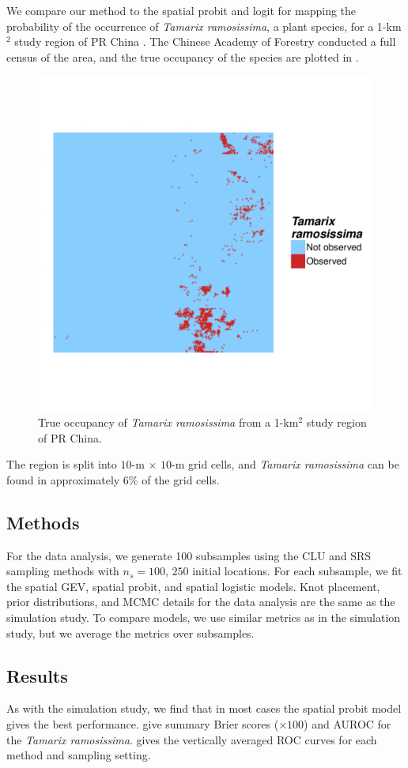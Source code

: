 We compare our method to the spatial probit and logit for mapping the probability of the occurrence of \emph{Tamarix ramosissima}, a plant species, for a 1-km$^2$ study region of PR China \citep{Smith2012}.
The Chinese Academy of Forestry conducted a full census of the area, and the true occupancy of the species are plotted in .
\begin{figure}
  \centering
  \includegraphics[width=0.5\linewidth, trim=0 10em 0 10em]{plots/tamarix-census.pdf}
  \caption{True occupancy of \emph{Tamarix ramosissima} from a 1-km$^2$ study region of PR China.}
  \label{rbfig:occupancy}
\end{figure}
The region is split into $10$-m $\times$ $10$-m grid cells, and \emph{Tamarix ramosissima} can be found in approximately $6\%$ of the grid cells.

\subsection{Methods} \label{rbs:datamethods}
For the data analysis, we generate 100 subsamples using the CLU and SRS sampling methods with $n_s = 100$, $250$ initial locations.
For each subsample, we fit the spatial GEV, spatial probit, and spatial logistic models.
Knot placement, prior distributions, and MCMC details for the data analysis are the same as the simulation study.
To compare models, we use similar metrics as in the simulation study, but we average the metrics over subsamples.

\subsection{Results}\label{rbs:dataresults}
As with the simulation study, we find that in most cases the spatial probit model gives the best performance.
 give summary Brier scores ($\times 100$) and AUROC for the \emph{Tamarix ramosissima}.
 gives the vertically averaged ROC curves for each method and sampling setting.


